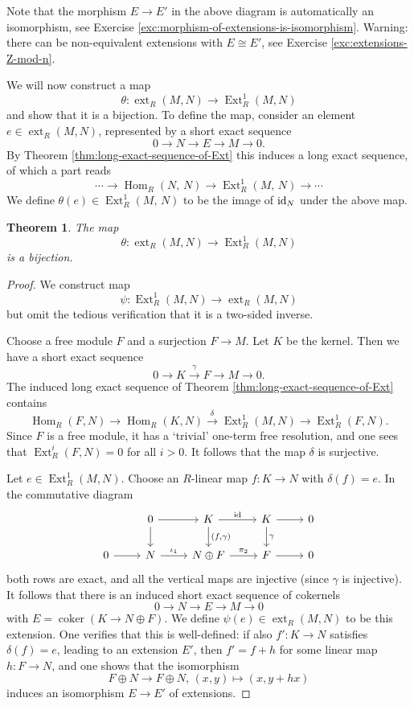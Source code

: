 \documentclass[11pt]{amsbook}
\newcommand{\longto}{\longrightarrow}
\DeclareMathOperator\Hom{Hom}
\DeclareMathOperator\coker{coker}
\DeclareMathOperator\Ext{Ext}
\DeclareMathOperator\ext{ext}
\def\id{{\rm id}}
\theoremstyle{plain}
\newtheorem{theorem}{Theorem}
\theoremstyle{definition}
\begin{document}
Note that the morphism $E\to E'$ in the above diagram is automatically an isomorphism, see Exercise \ref{exc:morphism-of-extensions-is-isomorphism}. Warning: there can be non-equivalent extensions with $E\cong E'$, see Exercise \ref{exc:extensions-Z-mod-n}.


We will now construct a map
\[
	\theta\colon \ext_R(M,N) \to \Ext^1_R(M,N)
\]
and show that it is a bijection. To define the map, consider an element $e\in \ext_R(M,N)$, represented by a 
short exact sequence
\[
	0 \longto N \longto E \longto M \longto 0.
\]
By Theorem \ref{thm:long-exact-sequence-of-Ext} this induces a long exact sequence, of which a part reads
\[
	\cdots \longto \Hom_R(N,\, N) \longto \Ext^1_R(M,\,N) \longto \cdots
\]
We define $\theta(e) \in \Ext^1_R(M,\,N)$ to be the image of $\id_N$ under the above map. 

\begin{theorem}\label{thm:main-thm-ext}
The map
\[
	\theta\colon \ext_R(M,N) \to \Ext^1_R(M,N)
\]
is a bijection.
\end{theorem}

\begin{proof}
We construct map 
\[
	\psi\colon \Ext^1_R(M,N) \to \ext_R(M,N)
\]
but omit the tedious verification that it is a two-sided inverse.

Choose a free module $F$ and a surjection $F\to M$. Let $K$ be the kernel. Then we have a short exact sequence
\[
	0 \longto K \overset{\gamma}{\longto} F \longto M \longto 0.
\]
The induced long exact sequence of Theorem \ref{thm:long-exact-sequence-of-Ext} contains
\[
	\Hom_R(F,N) \longto \Hom_R(K,N) \overset{\delta}{\longto} \Ext^1_R(M,N) \longto \Ext^1_R(F,N).
\]
Since $F$ is a free module, it has a `trivial' one-term free resolution, and one sees that $\Ext^i_R(F,N)=0$ for all $i>0$. It follows that the map $\delta$ is surjective.

Let $e \in \Ext^1_R(M,N)$. Choose an $R$-linear map $f\colon K \to N$ with $\delta(f)=e$.
In the commutative diagram
\[
\begin{tikzcd}
& 0 \arrow{r} \arrow{d} 
	& K \arrow{r}{\id} \arrow{d}{(f,\gamma)} & K \arrow{r} \arrow{d}{\gamma} & 0 \\
0 \arrow{r} & N \arrow{r}{\iota_1} & N \oplus F \arrow{r}{\pi_2} & F \arrow{r} & 0
\end{tikzcd}
\]
both rows are exact, and all the vertical maps are injective (since $\gamma$ is injective). It follows that there is an induced short exact sequence of cokernels
\[
	 0 \longto N \longto E \longto M \longto 0
\]
with $E=\coker(K \to N\oplus F)$. We define $\psi(e)\in \ext_R(M,N)$ to be this extension. One verifies that this is well-defined: if also $f'\colon K\to N$ satisfies $\delta(f)=e$, leading to an extension $E'$, then $f'=f+h$ for some linear map $h\colon F\to N$, and one shows that the isomorphism
\[
	F\oplus N \to F\oplus N,\, (x,y) \mapsto (x,y+hx)
\]
induces an isomorphism $E\to E'$ of extensions.
\end{proof}
\end{document}
